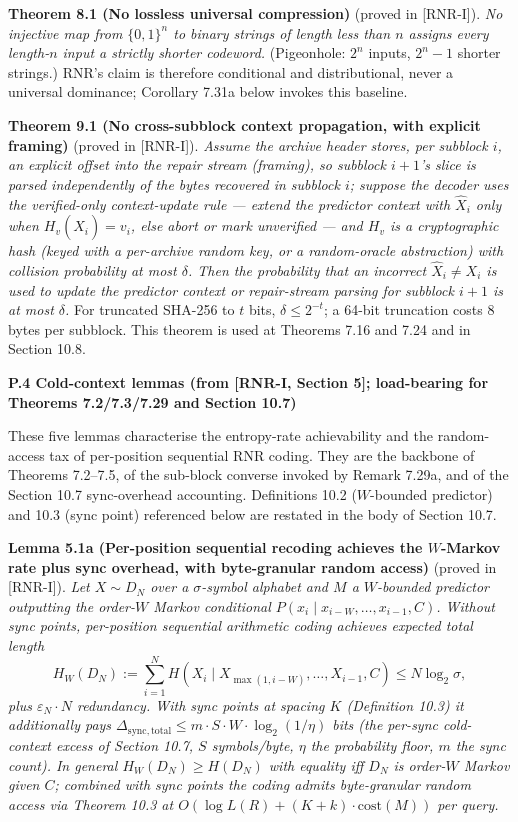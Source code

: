 \documentclass[
]{article}
\begin{document}
\textbf{Theorem 8.1 (No lossless universal compression)} (proved in
[RNR-I]). \emph{No injective map from $\{0,1\}^n$ to binary strings of
length less than $n$ assigns every length-$n$ input a strictly shorter
codeword.} (Pigeonhole: $2^n$ inputs, $2^n - 1$ shorter strings.) RNR's
claim is therefore conditional and distributional, never a universal
dominance; Corollary 7.31a below invokes this baseline.

\textbf{Theorem 9.1 (No cross-subblock context propagation, with explicit
framing)} (proved in [RNR-I]). \emph{Assume the archive header stores, per
subblock $i$, an explicit offset into the repair stream (framing), so
subblock $i{+}1$'s slice is parsed independently of the bytes recovered in
subblock $i$; suppose the decoder uses the verified-only context-update
rule --- extend the predictor context with $\hat{X}_i$ only when
$H_v(\hat{X}_i) = v_i$, else abort or mark unverified --- and $H_v$ is a
cryptographic hash (keyed with a per-archive random key, or a random-oracle
abstraction) with collision probability at most $\delta$. Then the
probability that an incorrect $\hat{X}_i \ne X_i$ is used to update the
predictor context or repair-stream parsing for subblock $i{+}1$ is at most
$\delta$.} For truncated SHA-256 to $t$ bits, $\delta \le 2^{-t}$; a 64-bit
truncation costs 8 bytes per subblock. This theorem is used at Theorems
7.16 and 7.24 and in Section 10.8.

\textbf{P.4 Cold-context lemmas (from [RNR-I, Section 5]; load-bearing for
Theorems 7.2/7.3/7.29 and Section 10.7)}

These five lemmas characterise the entropy-rate achievability and the
random-access tax of per-position sequential RNR coding. They are the
backbone of Theorems 7.2--7.5, of the sub-block converse invoked by Remark
7.29a, and of the Section 10.7 sync-overhead accounting. Definitions 10.2
($W$-bounded predictor) and 10.3 (sync point) referenced below are restated
in the body of Section 10.7.

\textbf{Lemma 5.1a (Per-position sequential recoding achieves the
$W$-Markov rate plus sync overhead, with byte-granular random access)}
(proved in [RNR-I]). \emph{Let $X \sim D_N$ over a $\sigma$-symbol
alphabet and $M$ a $W$-bounded predictor outputting the order-$W$ Markov
conditional $P(x_i \mid x_{i-W},\dots,x_{i-1},C)$. Without sync points,
per-position sequential arithmetic coding achieves expected total length}
\[
H_W(D_N) := \sum_{i=1}^N H(X_i \mid X_{\max(1,i-W)},\dots,X_{i-1}, C)
\le N \log_2 \sigma,
\]
\emph{plus $\varepsilon_N \cdot N$ redundancy. With sync points at spacing
$K$ (Definition 10.3) it additionally pays
$\Delta_{\mathrm{sync,total}} \le m \cdot S \cdot W \cdot \log_2(1/\eta)$
bits (the per-sync cold-context excess of Section 10.7, $S$ symbols/byte,
$\eta$ the probability floor, $m$ the sync count). In general
$H_W(D_N) \ge H(D_N)$ with equality iff $D_N$ is order-$W$ Markov given
$C$; combined with sync points the coding admits byte-granular random
access via Theorem 10.3 at $O(\log L(R) + (K+k)\cdot\mathrm{cost}(M))$ per
query.}
\end{document}
